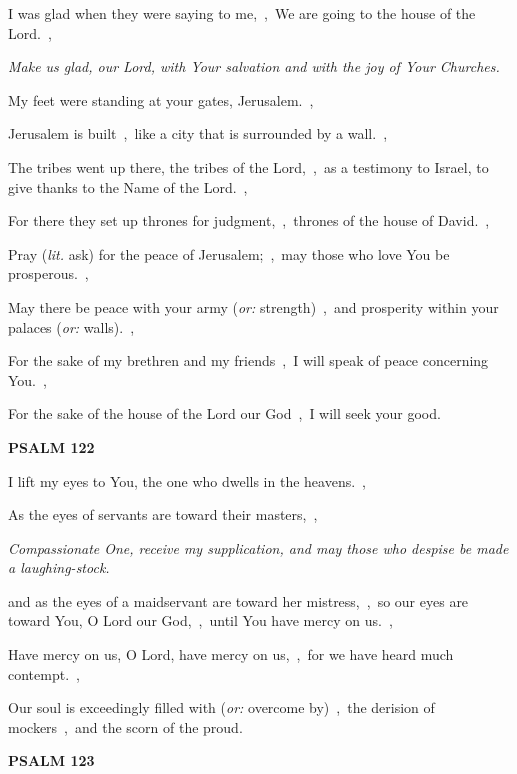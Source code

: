 \documentclass[12pt,twoside,a5paper]{article}
\newcommand{\psalm}[1]{\textbf{PSALM {#1}}\nopagebreak}
\newcommand{\qanona}[1]{{\liturgicalhint{Qanona.} \emph{#1}}}
\newcommand{\translationoption}[1]{\emph{or:} #1}
\newcommand{\translationliteral}[1]{\emph{lit.} #1}
\begin{document}
\begin{normalparskip}
  I was glad when they were saying to me,~\sep\ We are going to the house of the Lord.~\sep

  \qanona{Make us glad, our Lord, with Your salvation and with the joy of Your Churches.}

  My feet were standing at your gates, Jerusalem.~\sep

  Jerusalem is built~\sep\ like a city that is surrounded by a wall.~\sep

  The tribes went up there, the tribes of the Lord,~\sep\ as a testimony to Israel, to give thanks to the Name of the Lord.~\sep

  For there they set up thrones for judgment,~\sep\ thrones of the house of David.~\sep

  Pray (\translationliteral{ask}) for the peace of Jerusalem;~\sep\ may those who love You be prosperous.~\sep

  May there be peace with your army (\translationoption{strength})~\sep\ and prosperity within your palaces (\translationoption{walls}).~\sep

  For the sake of my brethren and my friends~\sep\ I will speak of peace concerning You.~\sep

  For the sake of the house of the Lord our God~\sep\ I will seek your good.
\end{normalparskip}

\psalm{122}

\begin{normalparskip}
  I lift my eyes to You, the one who dwells in the heavens.~\sep

  As the eyes of servants are toward their masters,~\sep

  \qanona{Compassionate One, receive my supplication, and may those who despise be made a laughing-stock.}

  and as the eyes of a maidservant are toward her mistress,~\sep\ so our eyes are toward You, O Lord our God,~\sep\ until You have mercy on us.~\sep

  Have mercy on us, O Lord, have mercy on us,~\sep\ for we have heard much contempt.~\sep

  Our soul is exceedingly filled with (\translationoption{overcome by})~\sep\ the derision of mockers~\sep\ and the scorn of the proud.
\end{normalparskip}

\psalm{123}
\end{document}
